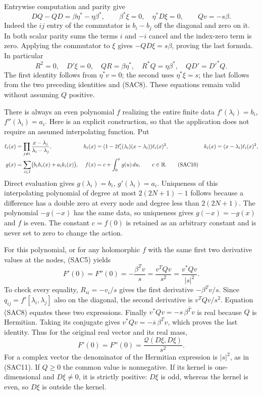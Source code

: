 Entrywise computation and parity give
\begin{equation}\tag{SAC8}
 DQ-QD=\beta\eta^*-\eta\beta^*,\qquad
 \beta^*\xi=0,\quad\eta^*D\xi=0,\qquad Qv=-s\beta.
\end{equation}
Indeed the $ij$ entry of the commutator is $b_i-b_j$ off
the diagonal and zero on it. In both scalar parity sums the
terms $i$ and $-i$ cancel and the index-zero term is zero.
Applying the commutator to $\xi$ gives
$-QD\xi=s\beta$, proving the last formula. In particular
\begin{equation}\tag{SAC9}
 R^2=0,\quad D'\xi=0,\quad QR=\beta\eta^*,\quad
 R^*Q=\eta\beta^*,\quad QD'=D'^*Q.
\end{equation}
The first identity follows from $\eta^*v=0$; the second uses
$\eta^*\xi=s$; the last follows from the two preceding
identities and (SAC8). These equations remain valid without
assuming $Q$ positive.

There is always an even polynomial $f$ realizing the entire
finite data $f'(\lambda_i)=b_i$, $f''(\lambda_i)=a_i$.
Here is an explicit construction, so that the application does
not require an assumed interpolating function. Put
\begin{align}
 \ell_i(x)&=\prod_{j\ne i}\frac{x-\lambda_j}{\lambda_i-\lambda_j},
 &h_i(x)&=(1-2\ell_i'(\lambda_i)(x-\lambda_i))\ell_i(x)^2,
 &k_i(x)&=(x-\lambda_i)\ell_i(x)^2,\notag\\
 g(x)&=\sum_{i\in I}\bigl(b_i h_i(x)+a_i k_i(x)\bigr),
 &f(x)&=c+\int_0^xg(u)\,du,\qquad c\in\mathbb R.
 \tag{SAC10}
\end{align}
Direct evaluation gives $g(\lambda_i)=b_i$,
$g'(\lambda_i)=a_i$. Uniqueness of this interpolating
polynomial of degree at most $2(2N+1)-1$ follows because a
difference has a double zero at every node and degree less
than $2(2N+1)$. The polynomial $-g(-x)$ has the same data,
so uniqueness gives $g(-x)=-g(x)$ and $f$ is even. The
constant $c=f(0)$ is retained as an arbitrary constant and is
never set to zero to change the action.

For this polynomial, or for any holomorphic $f$ with the same
first two derivative values at the nodes, (SAC5) yields
\begin{equation}\tag{SAC11}
 F'(0)=F''(0)
 =-\frac{\beta^Tv}{s}
 =\frac{v^TQv}{s^2}
 =\frac{v^*Qv}{|s|^2}.
\end{equation}
To check every equality, $R_{ii}=-v_i/s$ gives the first
derivative $-\beta^Tv/s$. Since $q_{ij}=f'[\lambda_i,\lambda_j]$
also on the diagonal, the second derivative is $v^TQv/s^2$.
Equation (SAC8) equates these two expressions.
Finally $v^*Qv=-s\,\overline{\beta^Tv}$ is real because $Q$
is Hermitian. Taking its conjugate gives
$v^*Qv=-\overline{s}\,\beta^Tv$, which proves the last
identity. Thus for the original real vector and its real mass,
\begin{equation}\tag{SAC12}
 F'(0)=F''(0)=\frac{\mathcal Q(D\xi,D\xi)}{s^2}.
\end{equation}
For a complex vector the denominator of the Hermitian
expression is $|s|^2$, as in (SAC11). If $Q\geq0$ the common
value is nonnegative. If its kernel is one-dimensional and
$D\xi\ne0$, it is strictly positive: $D\xi$ is odd, whereas
the kernel is even, so $D\xi$ is outside the kernel.

